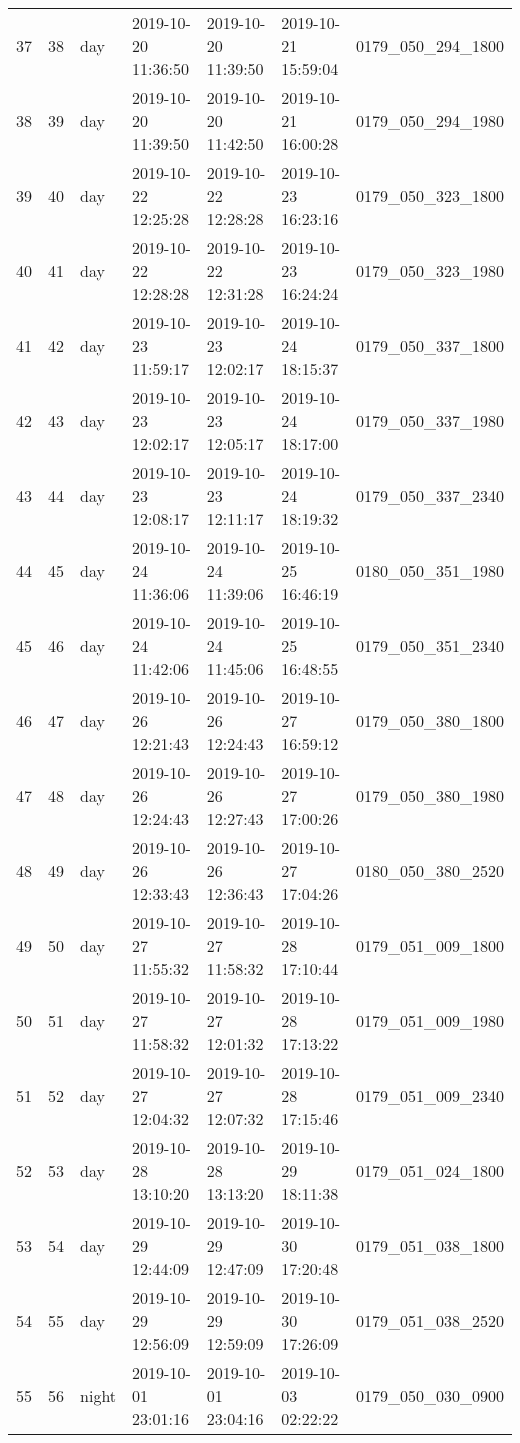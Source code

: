 \begin{longtable}{lrlllll}
37 & 38 & day & 2019-10-20 11:36:50 & 2019-10-20 11:39:50 & 2019-10-21 15:59:04 & 0179_050_294_1800 \\
38 & 39 & day & 2019-10-20 11:39:50 & 2019-10-20 11:42:50 & 2019-10-21 16:00:28 & 0179_050_294_1980 \\
39 & 40 & day & 2019-10-22 12:25:28 & 2019-10-22 12:28:28 & 2019-10-23 16:23:16 & 0179_050_323_1800 \\
40 & 41 & day & 2019-10-22 12:28:28 & 2019-10-22 12:31:28 & 2019-10-23 16:24:24 & 0179_050_323_1980 \\
41 & 42 & day & 2019-10-23 11:59:17 & 2019-10-23 12:02:17 & 2019-10-24 18:15:37 & 0179_050_337_1800 \\
42 & 43 & day & 2019-10-23 12:02:17 & 2019-10-23 12:05:17 & 2019-10-24 18:17:00 & 0179_050_337_1980 \\
43 & 44 & day & 2019-10-23 12:08:17 & 2019-10-23 12:11:17 & 2019-10-24 18:19:32 & 0179_050_337_2340 \\
44 & 45 & day & 2019-10-24 11:36:06 & 2019-10-24 11:39:06 & 2019-10-25 16:46:19 & 0180_050_351_1980 \\
45 & 46 & day & 2019-10-24 11:42:06 & 2019-10-24 11:45:06 & 2019-10-25 16:48:55 & 0179_050_351_2340 \\
46 & 47 & day & 2019-10-26 12:21:43 & 2019-10-26 12:24:43 & 2019-10-27 16:59:12 & 0179_050_380_1800 \\
47 & 48 & day & 2019-10-26 12:24:43 & 2019-10-26 12:27:43 & 2019-10-27 17:00:26 & 0179_050_380_1980 \\
48 & 49 & day & 2019-10-26 12:33:43 & 2019-10-26 12:36:43 & 2019-10-27 17:04:26 & 0180_050_380_2520 \\
49 & 50 & day & 2019-10-27 11:55:32 & 2019-10-27 11:58:32 & 2019-10-28 17:10:44 & 0179_051_009_1800 \\
50 & 51 & day & 2019-10-27 11:58:32 & 2019-10-27 12:01:32 & 2019-10-28 17:13:22 & 0179_051_009_1980 \\
51 & 52 & day & 2019-10-27 12:04:32 & 2019-10-27 12:07:32 & 2019-10-28 17:15:46 & 0179_051_009_2340 \\
52 & 53 & day & 2019-10-28 13:10:20 & 2019-10-28 13:13:20 & 2019-10-29 18:11:38 & 0179_051_024_1800 \\
53 & 54 & day & 2019-10-29 12:44:09 & 2019-10-29 12:47:09 & 2019-10-30 17:20:48 & 0179_051_038_1800 \\
54 & 55 & day & 2019-10-29 12:56:09 & 2019-10-29 12:59:09 & 2019-10-30 17:26:09 & 0179_051_038_2520 \\
55 & 56 & night & 2019-10-01 23:01:16 & 2019-10-01 23:04:16 & 2019-10-03 02:22:22 & 0179_050_030_0900 \\

\end{longtable}
